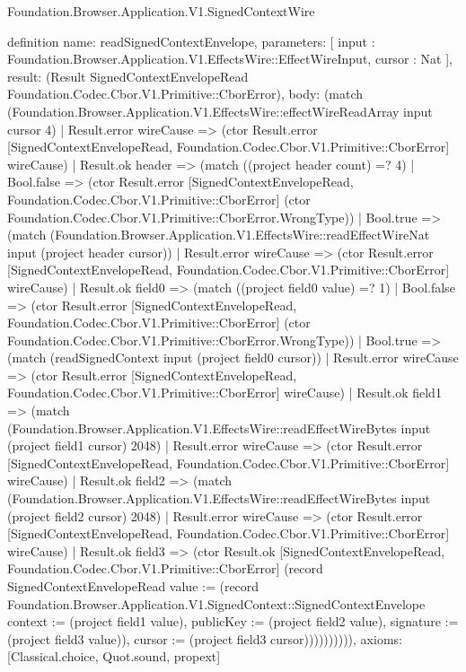 \begin{lexlean}{Foundation.Browser.Application.V1.SignedContextWire}
\begin{semanticmodule}
definition{
  name: readSignedContextEnvelope,
  parameters: [
    input : Foundation.Browser.Application.V1.EffectsWire::EffectWireInput,
    cursor : Nat
  ],
  result: (Result SignedContextEnvelopeRead Foundation.Codec.Cbor.V1.Primitive::CborError),
  body: (match (Foundation.Browser.Application.V1.EffectsWire::effectWireReadArray input cursor 4)
    | Result.error wireCause => (ctor Result.error [SignedContextEnvelopeRead, Foundation.Codec.Cbor.V1.Primitive::CborError] wireCause)
    | Result.ok header => (match ((project header count) =? 4)
      | Bool.false => (ctor Result.error [SignedContextEnvelopeRead, Foundation.Codec.Cbor.V1.Primitive::CborError] (ctor Foundation.Codec.Cbor.V1.Primitive::CborError.WrongType))
      | Bool.true => (match (Foundation.Browser.Application.V1.EffectsWire::readEffectWireNat input (project header cursor))
        | Result.error wireCause => (ctor Result.error [SignedContextEnvelopeRead, Foundation.Codec.Cbor.V1.Primitive::CborError] wireCause)
        | Result.ok field0 => (match ((project field0 value) =? 1)
          | Bool.false => (ctor Result.error [SignedContextEnvelopeRead, Foundation.Codec.Cbor.V1.Primitive::CborError] (ctor Foundation.Codec.Cbor.V1.Primitive::CborError.WrongType))
          | Bool.true => (match (readSignedContext input (project field0 cursor))
            | Result.error wireCause => (ctor Result.error [SignedContextEnvelopeRead, Foundation.Codec.Cbor.V1.Primitive::CborError] wireCause)
            | Result.ok field1 => (match (Foundation.Browser.Application.V1.EffectsWire::readEffectWireBytes input (project field1 cursor) 2048)
              | Result.error wireCause => (ctor Result.error [SignedContextEnvelopeRead, Foundation.Codec.Cbor.V1.Primitive::CborError] wireCause)
              | Result.ok field2 => (match (Foundation.Browser.Application.V1.EffectsWire::readEffectWireBytes input (project field2 cursor) 2048)
                | Result.error wireCause => (ctor Result.error [SignedContextEnvelopeRead, Foundation.Codec.Cbor.V1.Primitive::CborError] wireCause)
                | Result.ok field3 => (ctor Result.ok [SignedContextEnvelopeRead, Foundation.Codec.Cbor.V1.Primitive::CborError] (record SignedContextEnvelopeRead {value := (record Foundation.Browser.Application.V1.SignedContext::SignedContextEnvelope {context := (project field1 value), publicKey := (project field2 value), signature := (project field3 value)}), cursor := (project field3 cursor)}))))))))),
  axioms: [Classical.choice, Quot.sound, propext]
}


\end{semanticmodule}
\end{lexlean}
